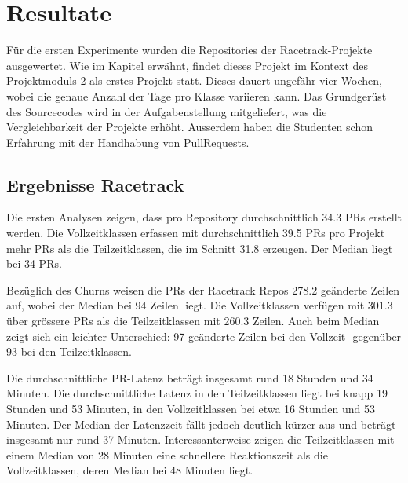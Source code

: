 


\chapter{Resultate} %

\label{Chapter4} %

Für die ersten Experimente wurden die Repositories der Racetrack-Projekte ausgewertet. Wie im Kapitel  erwähnt, findet dieses Projekt im Kontext des Projektmoduls 2 als erstes Projekt statt. Dieses dauert ungefähr vier Wochen, wobei die genaue Anzahl der Tage pro Klasse variieren kann. Das Grundgerüst des Sourcecodes wird in der Aufgabenstellung mitgeliefert, was die Vergleichbarkeit der Projekte erhöht. Ausserdem haben die Studenten schon Erfahrung mit der Handhabung von PullRequests. 

\section{Ergebnisse Racetrack}
Die ersten Analysen zeigen, dass pro Repository durchschnittlich 34.3 PRs erstellt werden. Die Vollzeitklassen erfassen mit durchschnittlich 39.5 PRs pro Projekt mehr PRs als die Teilzeitklassen, die im Schnitt 31.8 erzeugen. Der Median liegt bei 34 PRs.

Bezüglich des Churns weisen die PRs der Racetrack Repos 278.2 geänderte Zeilen auf, wobei der Median bei 94 Zeilen liegt. Die Vollzeitklassen verfügen mit 301.3 über grössere PRs als die Teilzeitklassen mit 260.3 Zeilen. Auch beim Median zeigt sich ein leichter Unterschied: 97 geänderte Zeilen bei den Vollzeit- gegenüber 93 bei den Teilzeitklassen. 

Die durchschnittliche PR-Latenz beträgt insgesamt rund 18 Stunden und 34 Minuten. Die durchschnittliche Latenz in den Teilzeitklassen liegt bei knapp 19 Stunden und 53 Minuten, in den Vollzeitklassen bei etwa 16 Stunden und 53 Minuten. Der Median der Latenzzeit fällt jedoch deutlich kürzer aus und beträgt insgesamt nur rund 37 Minuten. Interessanterweise zeigen die Teilzeitklassen mit einem Median von 28 Minuten eine schnellere Reaktionszeit als die Vollzeitklassen, deren Median bei 48 Minuten liegt.


